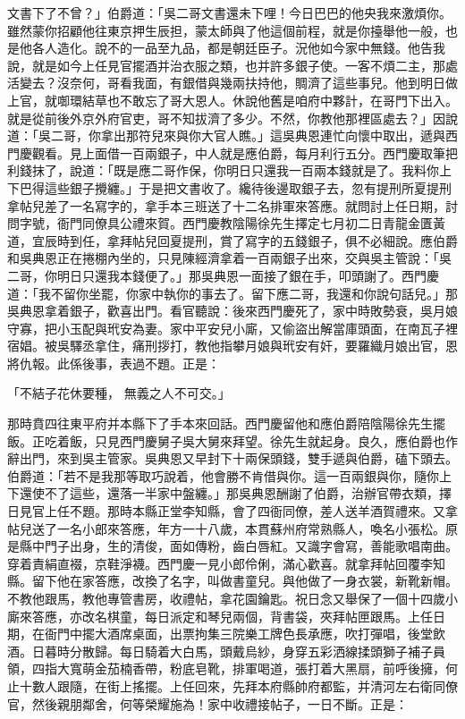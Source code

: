 文書下了不曾？」伯爵道：「吳二哥文書還未下哩！今日巴巴的他央我來激煩你。雖然蒙你招顧他往東京押生辰担，蒙太師與了他這個前程，就是你擡舉他一般，也是他各人造化。說不的一品至九品，都是朝廷臣子。況他如今家中無錢。他告我說，就是如今上任見官擺酒并治衣服之類，也并許多銀子使。一客不煩二主，那處活變去？沒奈何，哥看我面，有銀借與幾兩扶持他，賙濟了這些事兒。他到明日做上官，就啣環結草也不敢忘了哥大恩人。休說他舊是咱府中夥計，在哥門下出入。就是從前後外京外府官吏，哥不知拔濟了多少。不然，你教他那裡區處去？」因說道：「吳二哥，你拿出那符兒來與你大官人瞧。」這吳典恩連忙向懷中取出，遞與西門慶觀看。見上面借一百兩銀子，中人就是應伯爵，每月利行五分。西門慶取筆把利錢抹了，說道：「既是應二哥作保，你明日只還我一百兩本錢就是了。我料你上下巴得這些銀子攪纏。」于是把文書收了。纔待後邊取銀子去，忽有提刑所夏提刑拿帖兒差了一名寫字的，拿手本三班送了十二名排軍來答應。就問討上任日期，討問字號，衙門同僚具公禮來賀。西門慶教陰陽徐先生擇定七月初二日青龍金匱黃道，宜辰時到任，拿拜帖兒回夏提刑，賞了寫字的五錢銀子，俱不必細說。應伯爵和吳典恩正在捲棚內坐的，只見陳經濟拿着一百兩銀子出來，交與吳主管說：「吳二哥，你明日只還我本錢便了。」那吳典恩一面接了銀在手，叩頭謝了。西門慶道：「我不留你坐罷，你家中執你的事去了。留下應二哥，我還和你說句話兒。」那吳典恩拿着銀子，歡喜出門。看官聽說：後來西門慶死了，家中時敗勢衰，吳月娘守寡，把小玉配與玳安為妻。家中平安兒小廝，又偷盜出解當庫頭面，在南瓦子裡宿娼。被吳驛丞拿住，痛刑拶打，教他指攀月娘與玳安有奸，要羅織月娘出官，恩將仇報。此係後事，表過不題。正是：

「不結子花休要種，  無義之人不可交。」

那時賁四往東平府并本縣下了手本來回話。西門慶留他和應伯爵陪陰陽徐先生擺飯。正吃着飯，只見西門慶舅子吳大舅來拜望。徐先生就起身。良久，應伯爵也作辭出門，來到吳主管家。吳典恩又早封下十兩保頭錢，雙手遞與伯爵，磕下頭去。伯爵道：「若不是我那等取巧說着，他會勝不肯借與你。這一百兩銀與你，隨你上下還使不了這些，還落一半家中盤纏。」那吳典恩酬謝了伯爵，治辦官帶衣類，擇日見官上任不題。那時本縣正堂李知縣，會了四衙同僚，差人送羊酒賀禮來。又拿帖兒送了一名小郎來答應，年方一十八歲，本貫蘇州府常熟縣人，喚名小張松。原是縣中門子出身，生的清俊，面如傳粉，齒白唇紅。又識字會寫，善能歌唱南曲。穿着責絹直裰，京鞋淨襪。西門慶一見小郎伶俐，滿心歡喜。就拿拜帖回覆李知縣。留下他在家答應，改換了名字，叫做書童兒。與他做了一身衣裳，新靴新帽。不教他跟馬，教他專管書房，收禮帖，拿花園鑰匙。祝日念又舉保了一個十四歲小廝來答應，亦改名棋童，每日派定和琴兒兩個，背書袋，夾拜帖匣跟馬。上任日期，在衙門中擺大酒席桌面，出票拘集三院樂工牌色長承應，吹打彈唱，後堂飲酒。日暮時分散歸。每日騎着大白馬，頭戴烏紗，身穿五彩洒線揉頭獅子補子員領，四指大寬萌金茄楠香帶，粉底皂靴，排軍喝道，張打着大黑扇，前呼後擁，何止十數人跟隨，在街上搖擺。上任回來，先拜本府縣帥府都監，并清河左右衛同僚官，然後親朋鄰舍，何等榮耀施為！家中收禮接帖子，一日不斷。正是：


